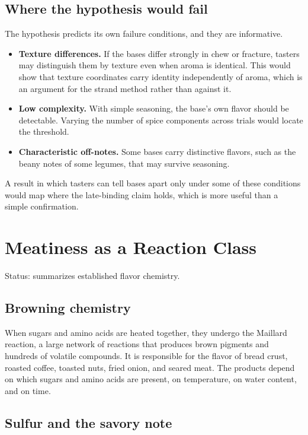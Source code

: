 \documentclass[11pt,openany]{book}
\theoremstyle{definition}
\begin{document}
\section{Where the hypothesis would fail}

The hypothesis predicts its own failure conditions, and they are informative.

\begin{itemize}
\item \textbf{Texture differences.} If the bases differ strongly in chew or fracture, tasters may distinguish them by texture even when aroma is identical. This would show that texture coordinates carry identity independently of aroma, which is an argument for the strand method rather than against it.
\item \textbf{Low complexity.} With simple seasoning, the base's own flavor should be detectable. Varying the number of spice components across trials would locate the threshold.
\item \textbf{Characteristic off-notes.} Some bases carry distinctive flavors, such as the beany notes of some legumes, that may survive seasoning.
\end{itemize}

A result in which tasters can tell bases apart only under some of these conditions would map where the late-binding claim holds, which is more useful than a simple confirmation.

\chapter{Meatiness as a Reaction Class}\label{ch:meaty}

Status: summarizes established flavor chemistry.

\section{Browning chemistry}

When sugars and amino acids are heated together, they undergo the Maillard reaction, a large network of reactions that produces brown pigments and hundreds of volatile compounds. It is responsible for the flavor of bread crust, roasted coffee, toasted nuts, fried onion, and seared meat. The products depend on which sugars and amino acids are present, on temperature, on water content, and on time.

\section{Sulfur and the savory note}
\end{document}
